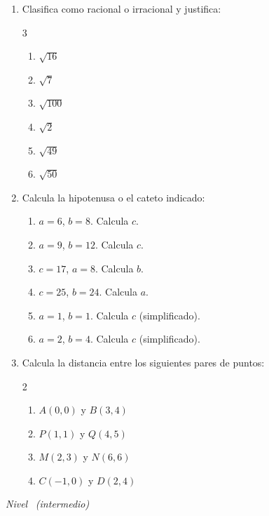 \documentclass[11pt, letterpaper]{article}
\begin{document}
\begin{enumerate}[label=\textbf{\arabic*.}, leftmargin=*]
  \item Clasifica como racional o irracional y justifica:
  \begin{multicols}{3}
  \begin{enumerate}[label=\alph*)]
    \item $\sqrt{16}$
    \item $\sqrt{7}$
    \item $\sqrt{100}$
    \item $\sqrt{2}$
    \item $\sqrt{49}$
    \item $\sqrt{50}$
  \end{enumerate}
  \end{multicols}

  \item Calcula la hipotenusa o el cateto indicado:
  \begin{enumerate}[label=\alph*)]
    \item $a=6$, $b=8$. Calcula $c$.
    \item $a=9$, $b=12$. Calcula $c$.
    \item $c=17$, $a=8$. Calcula $b$.
    \item $c=25$, $b=24$. Calcula $a$.
    \item $a=1$, $b=1$. Calcula $c$ (simplificado).
    \item $a=2$, $b=4$. Calcula $c$ (simplificado).
  \end{enumerate}

  \item Calcula la distancia entre los siguientes pares de puntos:
  \begin{multicols}{2}
  \begin{enumerate}[label=\alph*)]
    \item $A(0,0)$ y $B(3,4)$
    \item $P(1,1)$ y $Q(4,5)$
    \item $M(2,3)$ y $N(6,6)$
    \item $C(-1,0)$ y $D(2,4)$
  \end{enumerate}
  \end{multicols}
\end{enumerate}

\textit{Nivel} \bigstar\bigstar\ \textit{(intermedio)}
\end{document}
